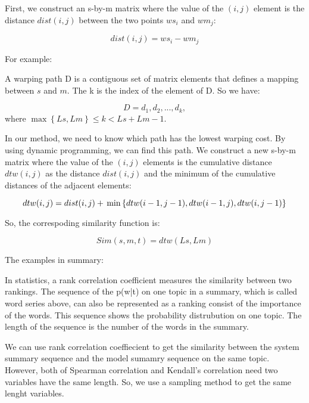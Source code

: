 First, we construct an s-by-m matrix where the value of the $(i, j)$ element 
is the distance $dist(i,j)$ between the two points $ws_{i}$ and $wm_{j}$:

\begin{equation*}
dist(i,j) = ws_{i}-wm_{j}
\end{equation*}

For example:
 
A warping path D is a contiguous set of matrix elements that defines
a mapping between $s$ and $m$. The k is the index of the element of D. 
So we have:

\[D = d_{1},d_{2},...,d_{k},\]
where $\max \left\{ Ls, Lm\right\} \leq k < Ls + Lm - 1$.

In our method, we need to know which path has the lowest warping cost. 
By using dynamic programming,  we can find this path. We construct a new s-by-m matrix 
where the value of the $(i,j)$ elements is the cumulative distance $dtw(i,j)$ as 
the distance $dist(i,j)$ and the minimum of the cumulative distances of 
the adjacent elements:

\begin{equation*}
dtw(i,j) = dist(i,j)+\\
          \min \left\{ dtw(i-1,j-1),dtw(i-1,j),dtw(i,j-1)\right\}
\end{equation*}

So, the correspoding similarity function is:

\begin{equation*}
Sim(s,m,t) = dtw(Ls,Lm)
\end{equation*}

The examples in summary:

In statistics, a rank correlation coefficient measures the similarity between two rankings. 
The sequence of the p(w|t) on one topic in a summary, which is called word series above, 
can also be represented as a ranking consist of the importance of the words. This sequence 
shows the probability distrubution on one topic. The length of the sequence is the number 
of the words in the summary. 

We can use rank correlation coeffiecient to get the similarity between the system summary 
sequence and the model sumamry sequence on the same topic. However, both of Spearman 
correlation  and Kendall's correlation need two variables have the same length. 
So, we use a sampling method to get the same lenght variables. 

